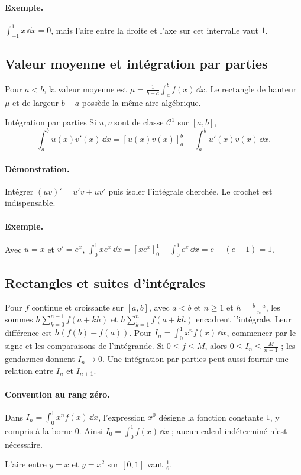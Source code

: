 \paragraph{Exemple.} $\int_{-1}^{1}x\,\dd x=0$, mais l'aire entre la droite et l'axe sur cet intervalle vaut $1$.
\subsection{Valeur moyenne et intégration par parties}
Pour $a<b$, la valeur moyenne est $\mu=\frac1{b-a}\int_a^b f(x)\,\dd x$. Le rectangle de hauteur $\mu$ et de largeur $b-a$ possède la même aire algébrique.
\begin{retenir}{Intégration par parties}
Si $u,v$ sont de classe $\mathcal C^1$ sur $[a,b]$,
\[\int_a^b u(x)v'(x)\,\dd x=[u(x)v(x)]_a^b-\int_a^b u'(x)v(x)\,\dd x.\]
\end{retenir}
\paragraph{Démonstration.} Intégrer $(uv)'=u'v+uv'$ puis isoler l'intégrale cherchée. Le crochet est indispensable.
\paragraph{Exemple.} Avec $u=x$ et $v'=e^x$, $\int_0^1xe^x\,\dd x=[xe^x]_0^1-\int_0^1e^x\,\dd x=e-(e-1)=1$.
\subsection{Rectangles et suites d'intégrales}
Pour $f$ continue et croissante sur $[a,b]$, avec $a<b$ et $n\ge1$ et $h=\frac{b-a}{n}$, les sommes $h\sum_{k=0}^{n-1}f(a+kh)$ et $h\sum_{k=1}^{n}f(a+kh)$ encadrent l'intégrale. Leur différence est $h(f(b)-f(a))$.
Pour $I_n=\int_0^1x^nf(x)\,\dd x$, commencer par le signe et les comparaisons de l'intégrande. Si $0\le f\le M$, alors $0\le I_n\le \frac{M}{n+1}$ ; les gendarmes donnent $I_n\to0$. Une intégration par parties peut aussi fournir une relation entre $I_n$ et $I_{n+1}$.
\paragraph{Convention au rang zéro.} Dans $I_n=\int_0^1x^nf(x)\,\dd x$, l'expression $x^0$ désigne la fonction constante $1$, y compris à la borne $0$. Ainsi $I_0=\int_0^1f(x)\,\dd x$ ; aucun calcul indéterminé n'est nécessaire.


\begin{center}\par\small L'aire entre $y=x$ et $y=x^2$ sur $[0,1]$ vaut $\frac{1}{6}$.\end{center}

